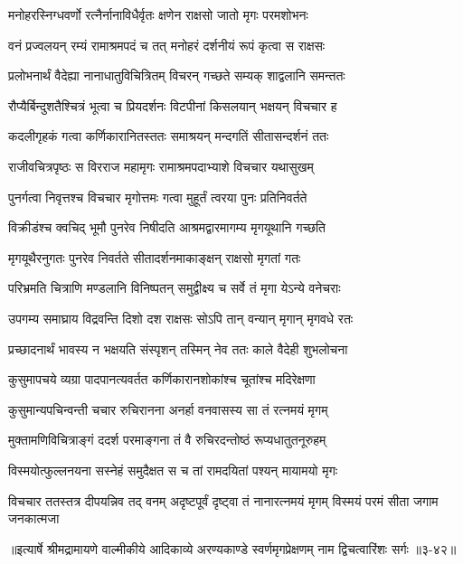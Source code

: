 \twolineshloka
{मनोहरस्निग्धवर्णो रत्नैर्नानाविधैर्वृतः}
{क्षणेन राक्षसो जातो मृगः परमशोभनः} %

\twolineshloka
{वनं प्रज्वलयन् रम्यं रामाश्रमपदं च तत्}
{मनोहरं दर्शनीयं रूपं कृत्वा स राक्षसः} %

\twolineshloka
{प्रलोभनार्थं वैदेह्या नानाधातुविचित्रितम्}
{विचरन् गच्छते सम्यक् शाद्वलानि समन्ततः} %

\twolineshloka
{रौप्यैर्बिन्दुशतैश्चित्रं भूत्वा च प्रियदर्शनः}
{विटपीनां किसलयान् भक्षयन् विचचार ह} %

\twolineshloka
{कदलीगृहकं गत्वा कर्णिकारानितस्ततः}
{समाश्रयन् मन्दगतिं सीतासन्दर्शनं ततः} %

\twolineshloka
{राजीवचित्रपृष्ठः स विरराज महामृगः}
{रामाश्रमपदाभ्याशे विचचार यथासुखम्} %

\twolineshloka
{पुनर्गत्वा निवृत्तश्च विचचार मृगोत्तमः}
{गत्वा मुहूर्तं त्वरया पुनः प्रतिनिवर्तते} %

\twolineshloka
{विक्रीडंश्च क्वचिद् भूमौ पुनरेव निषीदति}
{आश्रमद्वारमागम्य मृगयूथानि गच्छति} %

\twolineshloka
{मृगयूथैरनुगतः पुनरेव निवर्तते}
{सीतादर्शनमाकाङ्क्षन् राक्षसो मृगतां गतः} %

\twolineshloka
{परिभ्रमति चित्राणि मण्डलानि विनिष्पतन्}
{समुद्वीक्ष्य च सर्वे तं मृगा येऽन्ये वनेचराः} %

\twolineshloka
{उपगम्य समाघ्राय विद्रवन्ति दिशो दश}
{राक्षसः सोऽपि तान् वन्यान् मृगान् मृगवधे रतः} %

\twolineshloka
{प्रच्छादनार्थं भावस्य न भक्षयति संस्पृशन्}
{तस्मिन् नेव ततः काले वैदेही शुभलोचना} %

\twolineshloka
{कुसुमापचये व्यग्रा पादपानत्यवर्तत}
{कर्णिकारानशोकांश्च चूतांश्च मदिरेक्षणा} %

\twolineshloka
{कुसुमान्यपचिन्वन्ती चचार रुचिरानना}
{अनर्हा वनवासस्य सा तं रत्नमयं मृगम्} %

\twolineshloka
{मुक्तामणिविचित्राङ्गं ददर्श परमाङ्गना}
{तं वै रुचिरदन्तोष्ठं रूप्यधातुतनूरुहम्} %

\twolineshloka
{विस्मयोत्फुल्लनयना सस्नेहं समुदैक्षत}
{स च तां रामदयितां पश्यन् मायामयो मृगः} %

\threelineshloka
{विचचार ततस्तत्र दीपयन्निव तद् वनम्}
{अदृष्टपूर्वं दृष्ट्वा तं नानारत्नमयं मृगम्}
{विस्मयं परमं सीता जगाम जनकात्मजा} %


॥इत्यार्षे श्रीमद्रामायणे वाल्मीकीये आदिकाव्ये अरण्यकाण्डे स्वर्णमृगप्रेक्षणम् नाम द्विचत्वारिंशः सर्गः ॥३-४२॥
